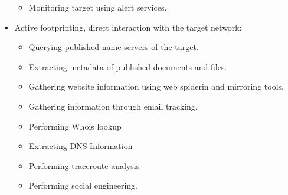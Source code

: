 \begin{itemize}
\begin{itemize}
        \item Monitoring target using alert services.
    \end{itemize}
    \item Active footprinting, direct interaction with the target network:
    \begin{itemize}
        \item Querying published name servers of the target.
        \item Extracting metadata of published documents and files.
        \item Gathering website information using web spiderin and mirroring tools.
        \item Gathering information through email tracking.
        \item Performing Whois lookup
        \item Extracting DNS Information
        \item Performing traceroute analysis
        \item Performing social engineering.
    \end{itemize}
\end{itemize}
